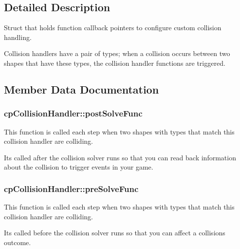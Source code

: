 \subsection{Detailed Description}
Struct that holds function callback pointers to configure custom collision handling. 

Collision handlers have a pair of types; when a collision occurs between two shapes that have these types, the collision handler functions are triggered. 

\subsection{Member Data Documentation}
\hypertarget{structcp_collision_handler_adc3df1896d48519cc5359c51bd67ac98}{}
\subsubsection[{post\+Solve\+Func}]{ cp\+Collision\+Handler\+::post\+Solve\+Func}\label{structcp_collision_handler_adc3df1896d48519cc5359c51bd67ac98}


This function is called each step when two shapes with types that match this collision handler are colliding. 

It\textquotesingle{}s called after the collision solver runs so that you can read back information about the collision to trigger events in your game. \hypertarget{structcp_collision_handler_aff35bdeedae80600cbbb1a68682a7431}{}
\subsubsection[{pre\+Solve\+Func}]{ cp\+Collision\+Handler\+::pre\+Solve\+Func}\label{structcp_collision_handler_aff35bdeedae80600cbbb1a68682a7431}


This function is called each step when two shapes with types that match this collision handler are colliding. 

It\textquotesingle{}s called before the collision solver runs so that you can affect a collision\textquotesingle{}s outcome. \hypertarget{structcp_collision_handler_a07bbc9d26af9d41cc87bae6514930d9f}{}
